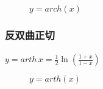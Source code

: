 \begin{figure}[H]
  \centering
    
    \caption{$y = arch(x)$}
    \label{arch_x}
\end{figure}

\subsubsection{反双曲正切}
\paragraph{}
$y = arth \, x = \frac{1}{2} \ln(\frac{1 + x}{1 - x})$

\begin{figure}[H]
  \centering
    
    \caption{$y = arth(x)$}
    \label{arth_x}
\end{figure}
